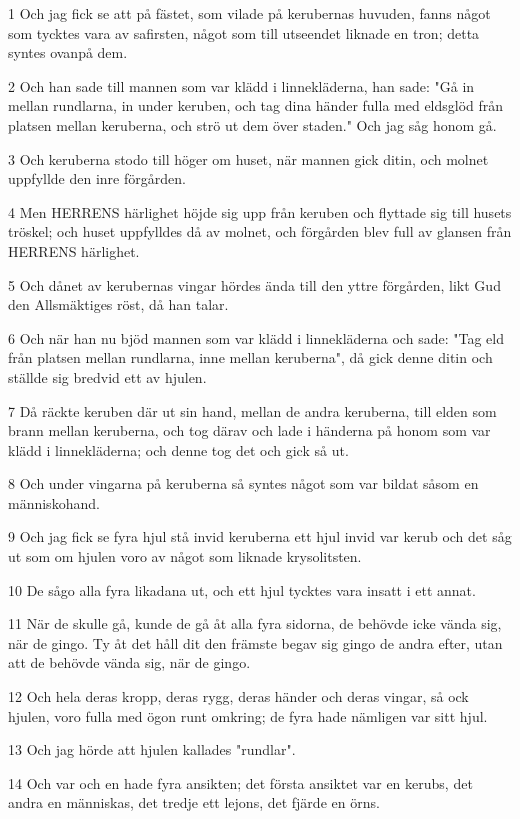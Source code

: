 \par 1 Och jag fick se att på fästet, som vilade på kerubernas huvuden, fanns något som tycktes vara av safirsten, något som till utseendet liknade en tron; detta syntes ovanpå dem.
\par 2 Och han sade till mannen som var klädd i linnekläderna, han sade: "Gå in mellan rundlarna, in under keruben, och tag dina händer fulla med eldsglöd från platsen mellan keruberna, och strö ut dem över staden." Och jag såg honom gå.
\par 3 Och keruberna stodo till höger om huset, när mannen gick ditin, och molnet uppfyllde den inre förgården.
\par 4 Men HERRENS härlighet höjde sig upp från keruben och flyttade sig till husets tröskel; och huset uppfylldes då av molnet, och förgården blev full av glansen från HERRENS härlighet.
\par 5 Och dånet av kerubernas vingar hördes ända till den yttre förgården, likt Gud den Allsmäktiges röst, då han talar.
\par 6 Och när han nu bjöd mannen som var klädd i linnekläderna och sade: "Tag eld från platsen mellan rundlarna, inne mellan keruberna", då gick denne ditin och ställde sig bredvid ett av hjulen.
\par 7 Då räckte keruben där ut sin hand, mellan de andra keruberna, till elden som brann mellan keruberna, och tog därav och lade i händerna på honom som var klädd i linnekläderna; och denne tog det och gick så ut.
\par 8 Och under vingarna på keruberna så syntes något som var bildat såsom en människohand.
\par 9 Och jag fick se fyra hjul stå invid keruberna ett hjul invid var kerub och det såg ut som om hjulen voro av något som liknade krysolitsten.
\par 10 De sågo alla fyra likadana ut, och ett hjul tycktes vara insatt i ett annat.
\par 11 När de skulle gå, kunde de gå åt alla fyra sidorna, de behövde icke vända sig, när de gingo. Ty åt det håll dit den främste begav sig gingo de andra efter, utan att de behövde vända sig, när de gingo.
\par 12 Och hela deras kropp, deras rygg, deras händer och deras vingar, så ock hjulen, voro fulla med ögon runt omkring; de fyra hade nämligen var sitt hjul.
\par 13 Och jag hörde att hjulen kallades "rundlar".
\par 14 Och var och en hade fyra ansikten; det första ansiktet var en kerubs, det andra en människas, det tredje ett lejons, det fjärde en örns.
